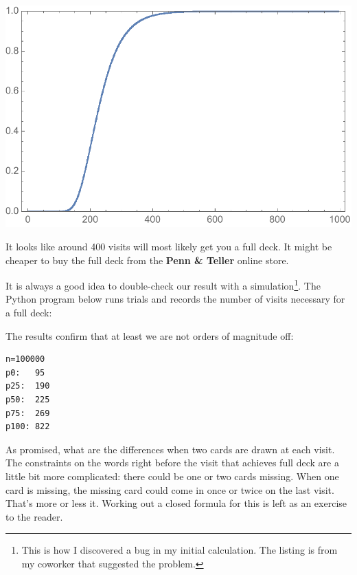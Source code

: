  
\includegraphics[scale=0.7]{cumulative.pdf}


It looks like around 400 visits will most likely get you a full deck. It might be cheaper to buy the full deck from the \textbf{Penn \& Teller} online store.

\newpage

It is always a good idea to double-check our result with a simulation\footnote{This is how I discovered a bug in my initial calculation. The listing is from my coworker that suggested the problem.}. The Python program below runs trials and records the number of visits necessary for a full deck:



The results confirm that at least we are not orders of magnitude off: 
\begin{lstlisting}
n=100000
p0:   95
p25:  190
p50:  225
p75:  269
p100: 822
\end{lstlisting}

As promised, what are the differences when two cards are drawn at each visit. The constraints on the words right before the visit that achieves full deck are a little bit more complicated: there could be one or two cards missing. When one card is missing, the missing card could come in once or twice on the last visit. That's more or less it. Working out a closed formula for this is left as an exercise to the reader.







